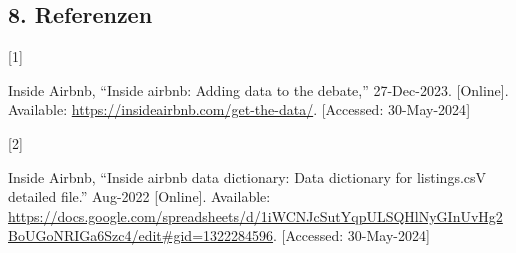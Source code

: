 \documentclass[
  journal,
]{IEEEtran}%
\newlength{\cslhangindent}
\newlength{\csllabelwidth}
\newlength{\cslentryspacingunit} %
\newenvironment{CSLReferences}[2] %
 {%
  \setlength{\parindent}{0pt}
  \ifodd #1
  \let\oldpar\par
  \def\par{\hangindent=\cslhangindent\oldpar}
  \fi
  \setlength{\parskip}{#2\cslentryspacingunit}
 }%
 {}
\newcommand{\CSLLeftMargin}[1]{\parbox[t]{\csllabelwidth}{#1}}
\newcommand{\CSLRightInline}[1]{\parbox[t]{\linewidth - \csllabelwidth}{#1}\break}
\providecommand{\bibfont}{\footnotesize}
\begin{document}
\hypertarget{referenzen}{%
\subsection*{8. Referenzen}\label{referenzen}}

\hypertarget{refs}{}
\begin{CSLReferences}{0}{0}
\leavevmode{}%
\CSLLeftMargin{{[}1{]} }%
\CSLRightInline{Inside Airbnb, {``Inside airbnb: Adding data to the
debate,''} 27-Dec-2023. {[}Online{]}. Available:
\url{https://insideairbnb.com/get-the-data/}. {[}Accessed:
30-May-2024{]}}

\leavevmode{}%
\CSLLeftMargin{{[}2{]} }%
\CSLRightInline{Inside Airbnb, {``Inside airbnb data dictionary: Data
dictionary for listings.csV detailed file.''} Aug-2022 {[}Online{]}.
Available:
\url{https://docs.google.com/spreadsheets/d/1iWCNJcSutYqpULSQHlNyGInUvHg2BoUGoNRIGa6Szc4/edit\#gid=1322284596}.
{[}Accessed: 30-May-2024{]}}

\end{CSLReferences}


\ifCLASSOPTIONcaptionsoff
  \newpage
\fi



\pagebreak[3]
\end{document}
